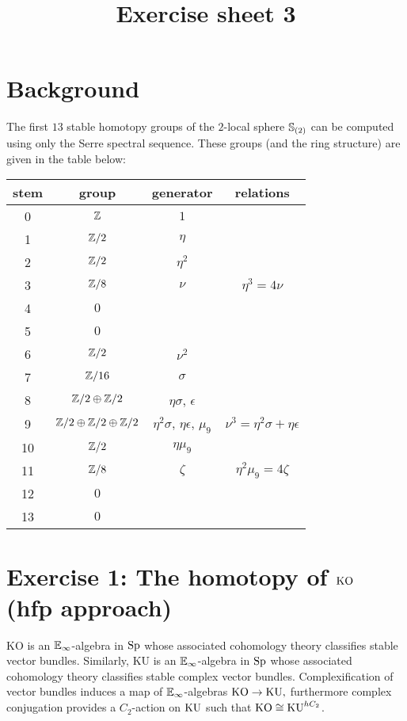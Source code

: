 \documentclass[reqno]{amsart}
\title{Exercise sheet 3}
\begin{document}
\maketitle


\section*{\bf Background}

The first $13$ stable homotopy groups of the $2$-local sphere $\mathbb{S}_{(2)}$ can be computed using only the Serre spectral sequence. 
These groups (and the ring structure) are given in the table below:

\begin{center}
  \begin{tabular}{|c|c|c|c|}\hline
    stem & group & generator & relations \\\hline\hline
    0 & $\mathbb{Z}$ & $1$ & \\\hline
    1 & $\mathbb{Z}/2$ & $\eta$ & \\\hline
    2 & $\mathbb{Z}/2$ & $\eta^2$ & \\\hline
    3 & $\mathbb{Z}/8$ & $\nu$ & $\eta^3 = 4\nu$ \\\hline
    4 & $0$ & & \\\hline
    5 & $0$ & & \\\hline
    6 & $\mathbb{Z}/2$ & $\nu^2$ & \\\hline
    7 & $\mathbb{Z}/16$ & $\sigma$ & \\\hline
    8 & $\mathbb{Z}/2 \oplus \mathbb{Z}/2$ & $\eta\sigma$, $\epsilon$ & \\\hline
    9 & $\mathbb{Z}/2 \oplus \mathbb{Z}/2 \oplus \mathbb{Z}/2$ & $\eta^2\sigma$, $\eta\epsilon$, $\mu_9$ & $\nu^3 = \eta^2\sigma + \eta\epsilon$ \\\hline
    10 & $\mathbb{Z}/2$ & $\eta\mu_9$ & \\\hline
    11 & $\mathbb{Z}/8$ & $\zeta$ & $\eta^2\mu_9 = 4\zeta$ \\\hline
    12 & $0$ & & \\\hline
    13 & $0$& & \\\hline
  \end{tabular}
\end{center}


\section{\bf Exercise 1: The homotopy of $\mathrm{KO}$ (hfp approach)}

$\mathrm{KO}$ is an $\mathbb{E}_\infty$-algebra in $\mathrm{Sp}$ whose associated cohomology theory
classifies stable vector bundles.
Similarly, $\mathrm{KU}$ is an $\mathbb{E}_\infty$-algebra in $\mathrm{Sp}$ whose associated cohomology theory
classifies stable complex vector bundles.
Complexification of vector bundles induces a map of $\mathbb{E}_{\infty}$-algebras
$\mathrm{KO} \to \mathrm{KU},$
furthermore complex conjugation provides a $C_2$-action on $\mathrm{KU}$ such that
$\mathrm{KO} \cong \mathrm{KU}^{hC_2}$.
\end{document}
